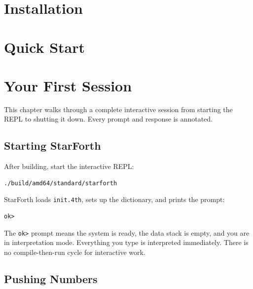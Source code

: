 \chapter{Installation}


\chapter{Quick Start}


\chapter{Your First Session}
\label{chap:first-session}

This chapter walks through a complete interactive session from starting the
REPL to shutting it down. Every prompt and response is annotated.

\section{Starting StarForth}
\label{sec:starting}

After building, start the interactive REPL:

\begin{lstlisting}[language=bash]
./build/amd64/standard/starforth
\end{lstlisting}

StarForth loads \texttt{init.4th}, sets up the dictionary, and prints the
prompt:

\begin{lstlisting}[language=Forth]
ok>
\end{lstlisting}

The \texttt{ok>} prompt means the system is ready, the data stack is empty, and
you are in interpretation mode. Everything you type is interpreted immediately.
There is no compile-then-run cycle for interactive work.

\section{Pushing Numbers}
\label{sec:push-numbers}

